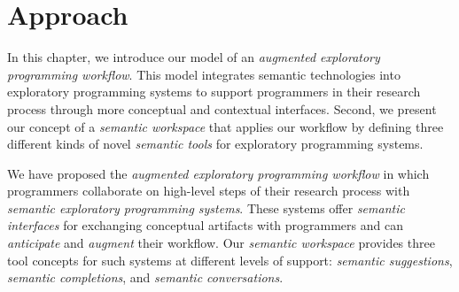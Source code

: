 
\chapter{Approach}
\label{cha:approach}

In this chapter, we introduce our model of an \emph{augmented exploratory programming workflow}.
This model integrates semantic technologies into exploratory programming systems to support programmers in their research process through more conceptual and contextual interfaces.
Second, we present our concept of a \emph{semantic workspace} that applies our workflow by defining three different kinds of novel \emph{semantic tools} for exploratory programming systems.


\begin{summary}
	We have proposed the \emph{augmented exploratory programming workflow} in which programmers collaborate on high-level steps of their research process with \emph{semantic exploratory programming systems}.
	These systems offer \emph{semantic interfaces} for exchanging conceptual artifacts with programmers and can \emph{anticipate} and \emph{augment} their workflow.
	Our \emph{semantic workspace} provides three tool concepts for such systems at different levels of support: \emph{semantic suggestions}, \emph{semantic completions}, and \emph{semantic conversations}.
\end{summary}
